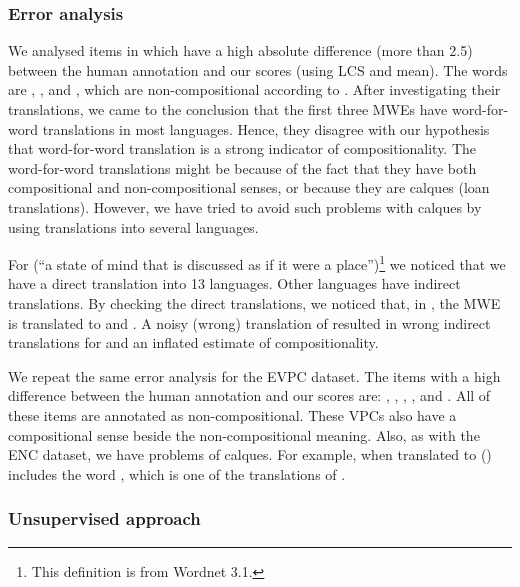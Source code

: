 \documentclass[output=paper,modfonts,nonflat]{langsci/langscibook}
\begin{document}
\subsubsection{Error analysis}
\label{sec:ss:erroranalysis}

We analysed items in \REDDY which have a high absolute difference (more than
2.5) between the human annotation and our scores (using LCS and
mean). The words are , ,
 and , which are
non-compositional according to \REDDY. After investigating their
translations, we came to the conclusion that the first three MWEs have
word-for-word translations in most languages. Hence, they disagree
with our hypothesis that word-for-word translation is a strong
indicator of compositionality.  The word-for-word translations might
be because of the fact that they have both compositional and
non-compositional senses, or because they are calques (loan
translations). However, we have tried to avoid such problems with
calques by using translations into several languages.

For  (``a state of mind that is discussed as if it
were a place'')\footnote{This definition is from Wordnet 3.1.} we
noticed that we have a direct translation into 13 languages. Other
languages have indirect translations. By checking the direct
translations, we noticed that, in , the MWE is translated to
 and . A noisy (wrong) translation of
  resulted in wrong indirect translations for
 and an inflated estimate of compositionality.

We repeat the same error analysis for the EVPC dataset. The items with
a high difference between the human annotation and our scores are:
, , ,
,  and . All
of these items are annotated as non-compositional. These VPCs also
have a compositional sense beside the non-compositional meaning. Also,
as with the ENC dataset, we have problems of calques. For example, 
 when translated to  ()
includes the word , which is one of the translations of
.

\subsubsection{Unsupervised approach}
\label{sec:ch4-1:unsupervised}
\end{document}
